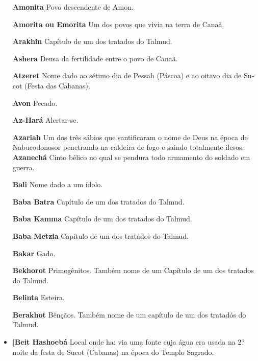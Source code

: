 \begin{itemize}
\begin{enumrate}
\begin{itemize}
\begin{itemize}
\begin{itemize}
\begin{itemize}
\begin{itemize}
\item[\textbf{Amonita}] Povo descendente de Amon.

\item[\textbf{Amorita ou Emorita}] Um dos povos que vivia na terra de Canaã.

\item[\textbf{Arakhin}] Capítulo de um dos tratados do Talmud.

\item[\textbf{Ashera}] Deusa da fertilidade entre o povo de Canaã.

\item[\textbf{Atzeret}] Nome dado ao sétimo dia de Pessah (Páscoa) e ao
oitavo dia de Su­cot (Festa das Cabanas).

\item[\textbf{Avon}] Pecado.

\item[\textbf{Az-Hará}] Alertar-se.

\item[\textbf{Azariah}] Um dos três sábios que san­tificaram o nome de Deus
na época de Nabucodonosor penetrando na caldei­ra de fogo e saindo
totalmente ilesos. \textbf{Azanechá} Cinto bélico no qual se pendura
todo armamento do soldado em guerra.

\item[\textbf{Bali}]  Nome dado a um ídolo.

\item[\textbf{Baba Batra}] Capítulo de um dos tra­tados do Talmud.

\item[\textbf{Baba Kamma}] Capítulo de um dos tratados do Talmud.

\item[\textbf{Baba Metzia}] Capítulo de um dos tra­tados do Talmud.

\item[\textbf{Bakar}] Gado.

\item[\textbf{Bekhorot}] Primogênitos. Também nome de um Capítulo de um dos
trata­dos do Talmud.

\item[\textbf{Belinta}] Esteira.

\item[\textbf{Berakhot}] Bênçãos. Também nome de um capítulo de um dos
tratadós do Talmud.

\item[\textbf{Beit Hashoebá} Local onde ha: via uma fonte
cuja água era usada na 2? noite da festa de Sucot (Cabanas) na época do
Templo Sagrado.


\end{itemize}
\end{itemize}
\end{itemize}
\end{itemize}
\end{itemize}
\end{enumrate}
\end{itemize}
